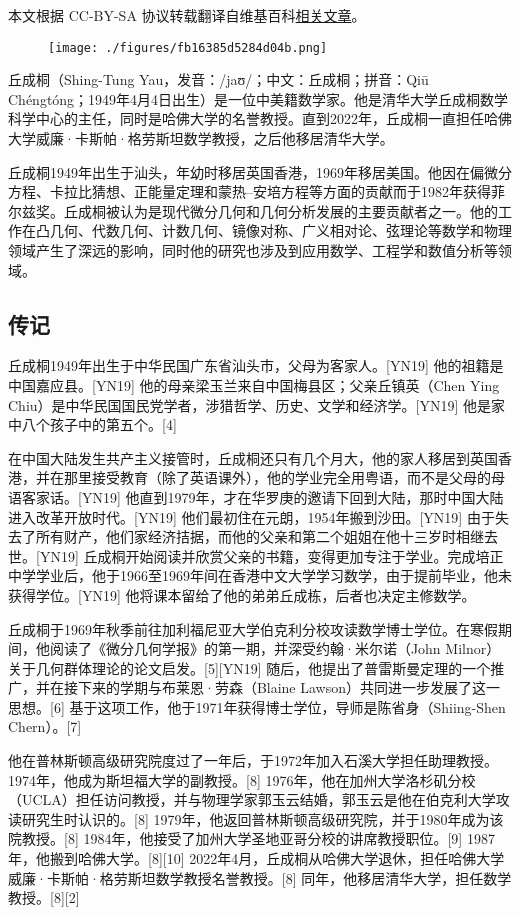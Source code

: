 
本文根据 CC-BY-SA 协议转载翻译自维基百科\href{https://en.wikipedia.org/wiki/Shing-Tung_Yau}{相关文章}。

\begin{figure}[ht]
\centering
\texttt{[image: ./figures/fb16385d5284d04b.png]}
\caption{} \label{fig_QCT_1}
\end{figure}
丘成桐（Shing-Tung Yau，发音：/jaʊ/；中文：丘成桐；拼音：Qiū Chéngtóng；1949年4月4日出生）是一位中美籍数学家。他是清华大学丘成桐数学科学中心的主任，同时是哈佛大学的名誉教授。直到2022年，丘成桐一直担任哈佛大学威廉·卡斯帕·格劳斯坦数学教授，之后他移居清华大学。

丘成桐1949年出生于汕头，年幼时移居英国香港，1969年移居美国。他因在偏微分方程、卡拉比猜想、正能量定理和蒙热–安培方程等方面的贡献而于1982年获得菲尔兹奖。丘成桐被认为是现代微分几何和几何分析发展的主要贡献者之一。他的工作在凸几何、代数几何、计数几何、镜像对称、广义相对论、弦理论等数学和物理领域产生了深远的影响，同时他的研究也涉及到应用数学、工程学和数值分析等领域。
\subsection{传记}  
丘成桐1949年出生于中华民国广东省汕头市，父母为客家人。[YN19] 他的祖籍是中国嘉应县。[YN19] 他的母亲梁玉兰来自中国梅县区；父亲丘镇英（Chen Ying Chiu）是中华民国国民党学者，涉猎哲学、历史、文学和经济学。[YN19] 他是家中八个孩子中的第五个。[4]

在中国大陆发生共产主义接管时，丘成桐还只有几个月大，他的家人移居到英国香港，并在那里接受教育（除了英语课外），他的学业完全用粤语，而不是父母的母语客家话。[YN19] 他直到1979年，才在华罗庚的邀请下回到大陆，那时中国大陆进入改革开放时代。[YN19] 他们最初住在元朗，1954年搬到沙田。[YN19] 由于失去了所有财产，他们家经济拮据，而他的父亲和第二个姐姐在他十三岁时相继去世。[YN19] 丘成桐开始阅读并欣赏父亲的书籍，变得更加专注于学业。完成培正中学学业后，他于1966至1969年间在香港中文大学学习数学，由于提前毕业，他未获得学位。[YN19] 他将课本留给了他的弟弟丘成栋，后者也决定主修数学。

丘成桐于1969年秋季前往加利福尼亚大学伯克利分校攻读数学博士学位。在寒假期间，他阅读了《微分几何学报》的第一期，并深受约翰·米尔诺（John Milnor）关于几何群体理论的论文启发。[5][YN19] 随后，他提出了普雷斯曼定理的一个推广，并在接下来的学期与布莱恩·劳森（Blaine Lawson）共同进一步发展了这一思想。[6] 基于这项工作，他于1971年获得博士学位，导师是陈省身（Shiing-Shen Chern）。[7]

他在普林斯顿高级研究院度过了一年后，于1972年加入石溪大学担任助理教授。1974年，他成为斯坦福大学的副教授。[8] 1976年，他在加州大学洛杉矶分校（UCLA）担任访问教授，并与物理学家郭玉云结婚，郭玉云是他在伯克利大学攻读研究生时认识的。[8] 1979年，他返回普林斯顿高级研究院，并于1980年成为该院教授。[8] 1984年，他接受了加州大学圣地亚哥分校的讲席教授职位。[9] 1987年，他搬到哈佛大学。[8][10] 2022年4月，丘成桐从哈佛大学退休，担任哈佛大学威廉·卡斯帕·格劳斯坦数学教授名誉教授。[8] 同年，他移居清华大学，担任数学教授。[8][2]

